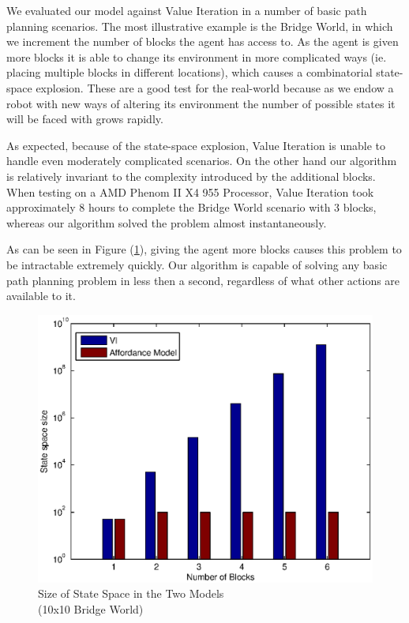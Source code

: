 \documentclass[a4paper]{article}
\begin{document}
We evaluated our model against Value Iteration in a number of basic path planning scenarios. The most illustrative example is the Bridge World, in which we increment the number of blocks the agent has access to. As the agent is given more blocks it is able to change its environment in more complicated ways (ie. placing multiple blocks in different locations), which causes a combinatorial state-space explosion. These are a good test for the real-world because as we endow a robot with new ways of altering its environment the number of possible states it will be faced with grows rapidly.

As expected, because of the state-space explosion, Value Iteration is unable to handle even moderately complicated scenarios. On the other hand our algorithm is relatively invariant to the complexity introduced by the additional blocks. When testing on a AMD Phenom II X4 955 Processor, Value Iteration took approximately 8 hours to complete the Bridge World scenario with 3 blocks, whereas our algorithm solved the problem almost instantaneously.

As can be seen in Figure (\ref{fig:chart}), giving the agent more blocks causes this problem to be intractable extremely quickly. Our algorithm is capable of solving any basic path planning problem in less then a second, regardless of what other actions are available to it. 

\begin{figure}[h]
\centering
\includegraphics[scale = 0.5]{images/statespace_size}
\caption{Size of State Space in the Two Models \\ (10x10 Bridge World)}
\label{fig:chart}
\end{figure}
\end{document}
